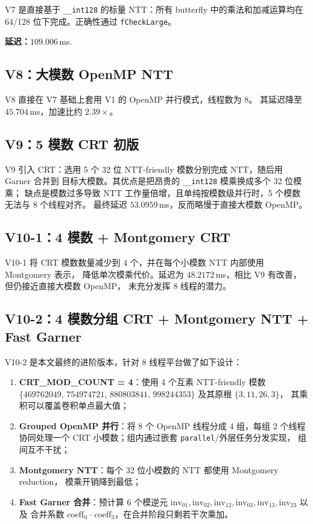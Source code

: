\documentclass[UTF8,a4paper,10pt]{ctexart}
\begin{document}
V7 是直接基于 \texttt{\_\_int128} 的标量 NTT：所有 butterfly 中的乘法和加减运算均在
64/128 位下完成。正确性通过 \texttt{fCheckLarge}。

\noindent\textbf{延迟：}\;$109.006$\,ms.

\subsection{V8：大模数 OpenMP NTT}

V8 直接在 V7 基础上套用 V1 的 OpenMP 并行模式，线程数为 8。
其延迟降至 $45.704$\,ms，加速比约 $2.39\times$。

\subsection{V9：5 模数 CRT 初版}

V9 引入 CRT：选用 5 个 32 位 NTT-friendly 模数分别完成 NTT，随后用 Garner 合并到
目标大模数。其优点是把昂贵的 \texttt{\_\_int128} 模乘换成多个 32 位模乘；
缺点是模数过多导致 NTT 工作量倍增，且单纯按模数级并行时，5 个模数无法与 8 个线程对齐。
最终延迟 $53.0959$\,ms，反而略慢于直接大模数 OpenMP。

\subsection{V10-1：4 模数 + Montgomery CRT}

V10-1 将 CRT 模数数量减少到 4 个，并在每个小模数 NTT 内部使用 Montgomery 表示，
降低单次模乘代价。延迟为 $48.2172$\,ms，相比 V9 有改善，但仍接近直接大模数 OpenMP，
未充分发挥 8 线程的潜力。

\subsection{V10-2：4 模数分组 CRT + Montgomery NTT + Fast Garner}

V10-2 是本文最终的进阶版本，针对 8 线程平台做了如下设计：

\begin{enumerate}
  \item \textbf{CRT\_MOD\_COUNT = 4}：使用 4 个互素 NTT-friendly 模数
        $\{469762049,\, 754974721,\, 880803841,\, 998244353\}$ 及其原根 $\{3, 11, 26, 3\}$，
        其乘积可以覆盖卷积单点最大值；
  \item \textbf{Grouped OpenMP 并行}：将 8 个 OpenMP 线程分成 4 组，每组 2 个线程
        协同处理一个 CRT 小模数；组内通过嵌套 \texttt{parallel}/外层任务分发实现，
        组间互不干扰；
  \item \textbf{Montgomery NTT}：每个 32 位小模数的 NTT 都使用 Montgomery reduction，
        模乘开销降到最低；
  \item \textbf{Fast Garner 合并}：预计算 6 个模逆元 $\mathrm{inv}_{01}, \mathrm{inv}_{02},
        \mathrm{inv}_{12}, \mathrm{inv}_{03}, \mathrm{inv}_{13}, \mathrm{inv}_{23}$ 以及
        合并系数 $\mathrm{coeff}_0$\,--\,$\mathrm{coeff}_3$，在合并阶段只剩若干次乘加。
\end{enumerate}
\end{document}
